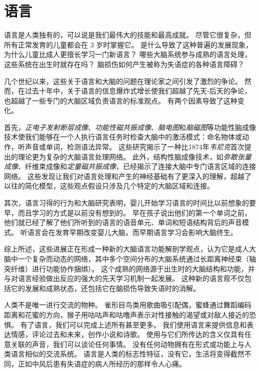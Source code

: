\chapter{语言} \label{chap:chap55}

语言是人类独有的，可以说是我们最伟大的技能和最高成就。
尽管它很复杂，但所有正常发育的儿童都会在 3 岁时掌握它。
是什么导致了这种普遍的发展现象，为什么儿童比成人更擅长学习一门新语言？
哪些大脑系统参与成熟的语言处理，这些系统在出生时就存在吗？
脑损伤如何产生被称为失语症的各种语言障碍？


几个世纪以来，这些关于语言和大脑的问题在理论家之间引发了激烈的争论。
然而，在过去十年中，关于语言的信息爆炸式增长使我们超越了先天-后天的争论，也超越了一些专门的大脑区域负责语言的标准观点。
有两个因素导致了这种变化。


首先，\textit{正电子发射断层成像}、\textit{功能性磁共振成像}、\textit{脑电图}和\textit{脑磁图}等功能性脑成像技术使我们能够在一个人执行语言任务时检查大脑中的激活模式：命名物体或动作，听声音或单词，检测语法异常。
这些研究揭示了一种比1874年\textit{韦尼克}首次提出的理论更为复杂的大脑语言处理网络。
此外，结构性脑成像技术，如\textit{弥散张量成像}、纤维束成像和\textit{定量磁共振成像}，已经揭示了连接大脑中专门语言区域的连接网络。
这些发现让我们对语言处理和产生的神经基础有了更深入的理解，超越了以往的简化模型，这些观点假设只涉及几个特定的大脑区域和连接。


其次，语言习得的行为和大脑研究表明，婴儿开始学习语言的时间比以前想象的要早，而且学习的方式是以前没有想到的。
早在孩子说出他们的第一个单词之前，他们就已经了解了他们所听到的语言的语音单元、单词和短语结构背后的声音模式。
听语言会在发育早期改变婴儿大脑，而早期语言学习会影响大脑终生。


综上所述，这些进展正在形成一种新的大脑语言功能解剖学观点，认为它是成人大脑中一个复杂而动态的网络，其中多个空间分布的大脑系统通过长距离神经束（轴突纤维）进行功能协作捆绑）。
这个成熟的网络源于出生时的大脑结构和功能，并与对语言经验做出反应的强大的先天学习机制一起发展。
这种新的语言观不仅包括它的发展和成熟状态，还包括它在脑损伤导致失语时的消解。


人类不是唯一进行交流的物种。
雀形目鸟类用歌曲吸引配偶，蜜蜂通过舞蹈编码距离和花蜜的方向，猴子用咕咕声和咕噜声表示对性接触的渴望或对敌人接近的恐惧。
有了语言，我们可以完成上述所有甚至更多。
我们使用语言来提供信息和表达情感，评论过去和未来，创作小说和诗歌。
使用与它们所传达的含义仅具有任意关联的声音，我们可以谈论任何事情。
没有任何动物拥有在形式或功能上与人类语言相似的交流系统。
语言是人类的标志性特征，没有它，生活将变得截然不同，正如中风后患有失语症的病人所经历的那样令人心痛。



